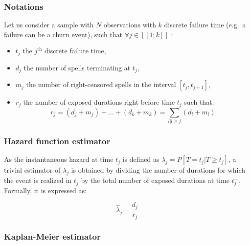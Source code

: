 \documentclass[
]{book}
\providecommand{\tightlist}{%
  \setlength{\itemsep}{0pt}\setlength{\parskip}{0pt}}
\begin{document}
\hypertarget{notations}{%
\subsubsection*{Notations}\label{notations}}

Let us consider a sample with \(N\) observations with \(k\) discrete failure time (e.g.~a failure can be a churn event), such that \(\forall j \in [\![1; k]\!]\) :

\begin{itemize}
\tightlist
\item
  \(t_j\) the \(j^{\text{th}}\) discrete failure time,
\item
  \(d_j\) the number of spells terminating at \(t_j\),
\item
  \(m_j\) the number of right-censored spells in the interval \([t_j, t_{j+1}]\),
\item
  \(r_j\) the number of exposed durations right before time \(t_j\) such that:
  \begin{equation}
  r_j = (d_j + m_j) + \dots + (d_k + m_k) = \sum_{l|l \geq j} (d_l + m_l)
  \label{eq:exposed}
  \end{equation}
\end{itemize}

\hypertarget{hazard-function-estimator}{%
\subsubsection*{Hazard function estimator}\label{hazard-function-estimator}}

As the instantaneous hazard at time \(t_j\) is defined as \(\lambda_j = P[T=t_j|T\geq t_j]\), a trivial estimator of \(\lambda_j\) is obtained by dividing the number of durations for which the event is realized in \(t_j\) by the total number of exposed durations at time \(t_j^{-}\). Formally, it is expressed as:

\begin{equation}
  \hat{\lambda}_j = \frac{d_j}{r_j}
  \label{eq:hazest}
\end{equation}

\hypertarget{kaplan-meier-estimator}{%
\subsubsection*{Kaplan-Meier estimator}\label{kaplan-meier-estimator}}
\end{document}

